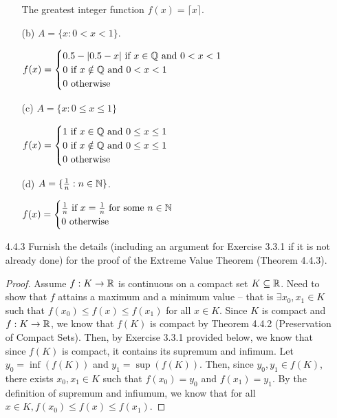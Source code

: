 \documentclass[12pt,letterpaper]{article}
\begin{document}
\begin{itemize}[leftmargin=!,labelindent=5pt]
\begin{itemize}
                    The greatest integer function $f(x) = \lceil x \rceil$.
                \item [(b)] $A = \{x : 0 < x < 1\}$.

                \(
                    f(x) = 
                    \begin{cases}
                        0.5 - \abs{0.5-x} \text{ if } x \in \mathbb{Q} \text{ and } 0 < x < 1\\
                        0 \text{ if } x \notin \mathbb{Q} \text{ and } 0 < x < 1\\
                        0 \text{ otherwise }
                    \end{cases}
                \)
                \item [(c)] $A = \{x : 0 \leq x \leq 1\}$

                \(
                    f(x) = 
                    \begin{cases}
                        1 \text{ if } x \in \mathbb{Q} \text{ and } 0 \leq x \leq 1\\
                        0 \text{ if } x \notin \mathbb{Q} \text{ and } 0 \leq x \leq 1\\
                        0 \text{ otherwise }
                    \end{cases}
                \)
                \item [(d)] $A = \{\frac{1}{n} : n \in \mathbb{N}\}$.
                
                \(
                    f(x) = 
                    \begin{cases}
                        \frac{1}{n} \text{ if } x = \frac{1}{n} \text{ for some } n \in \mathbb{N}\\
                        0 \text{ otherwise }
                    \end{cases}
                \)
            \end{itemize}
        \newpage
        \item [4.4.3] Furnish the details (including an argument for Exercise 3.3.1 if it is not already done) for the proof of the Extreme Value Theorem (Theorem 4.4.3).
            \begin{proof}
                Assume $f: K\to\mathbb{R}$ is continuous on a compact set $K \subseteq \mathbb{R}$.
                Need to show that $f$ attains a maximum and a minimum value -- that is $\exists x_0, x_1 \in K$ such that $f(x_0) \leq f(x) \leq f(x_1)$ for all $x \in K$.
                Since $K$ is compact and $f:K \to \mathbb{R}$, we know that $f(K)$ is compact by Theorem 4.4.2 (Preservation of Compact Sets).
                Then, by Exercise 3.3.1 provided below, we know that since $f(K)$ is compact, it contains its supremum and infimum.
                Let $y_0 = \inf(f(K))$ and $y_1 = \sup(f(K))$.
                Then, since $y_0, y_1 \in f(K)$, there exists $x_0, x_1 \in K$ such that $f(x_0) = y_0$ and $f(x_1) = y_1$.
                By the definition of supremum and infiumum, we know that for all $x \in K, f(x_0) \leq f(x) \leq f(x_1)$.
            \end{proof}


\end{itemize}
\end{document}
